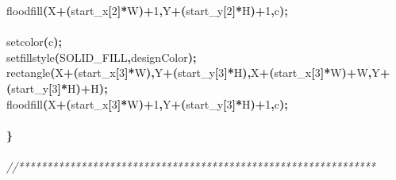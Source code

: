 \documentclass[a4paper, 10pt]{article}
\newcommand\SPC{\hspace*{0.6em}}
\newcommand{\CppAComment}[1]{\textit{\textcolor[rgb]{0.2,0.6,1}{#1}}}
\newcommand{\CppAIdentifier}[1]{#1}
\newcommand{\CppANumber}[1]{\textcolor[rgb]{0.5,0,0.5}{#1}}
\newcommand{\CppASpace}[1]{\colorbox[rgb]{1,1,1}{#1}}
\newcommand{\CppASymbol}[1]{\textbf{\textcolor[rgb]{1,0,0}{#1}}}
\begin{document}
\begin{ttfamily}
\CppASpace{\SPC }\CppAIdentifier{floodfill}\CppASymbol{(}\CppAIdentifier{X}\CppASymbol{+}\CppASymbol{(}\CppAIdentifier{start\_x}\CppASymbol{[}\CppANumber{2}\CppASymbol{]}\CppASymbol{*}\CppAIdentifier{W}\CppASymbol{)}\CppASymbol{+}\CppANumber{1}\CppASymbol{,}\CppAIdentifier{Y}\CppASymbol{+}\CppASymbol{(}\CppAIdentifier{start\_y}\CppASymbol{[}\CppANumber{2}\CppASymbol{]}\CppASymbol{*}\CppAIdentifier{H}\CppASymbol{)}\CppASymbol{+}\CppANumber{1}\CppASymbol{,}\CppAIdentifier{c}\CppASymbol{)}\CppASymbol{;}\\
\\
\CppASpace{\SPC }\CppAIdentifier{setcolor}\CppASymbol{(}\CppAIdentifier{c}\CppASymbol{)}\CppASymbol{;}\\
\CppASpace{\SPC }\CppAIdentifier{setfillstyle}\CppASymbol{(}\CppAIdentifier{SOLID\_FILL}\CppASymbol{,}\CppAIdentifier{designColor}\CppASymbol{)}\CppASymbol{;}\\
\CppASpace{\SPC }\CppAIdentifier{rectangle}\CppASymbol{(}\CppAIdentifier{X}\CppASymbol{+}\CppASymbol{(}\CppAIdentifier{start\_x}\CppASymbol{[}\CppANumber{3}\CppASymbol{]}\CppASymbol{*}\CppAIdentifier{W}\CppASymbol{)}\CppASymbol{,}\CppAIdentifier{Y}\CppASymbol{+}\CppASymbol{(}\CppAIdentifier{start\_y}\CppASymbol{[}\CppANumber{3}\CppASymbol{]}\CppASymbol{*}\CppAIdentifier{H}\CppASymbol{)}\CppASymbol{,}\CppAIdentifier{X}\CppASymbol{+}\CppASymbol{(}\CppAIdentifier{start\_x}\CppASymbol{[}\CppANumber{3}\CppASymbol{]}\CppASymbol{*}\CppAIdentifier{W}\CppASymbol{)}\CppASymbol{+}\CppAIdentifier{W}\CppASymbol{,}\CppAIdentifier{Y}\CppASymbol{+}\CppASymbol{(}\CppAIdentifier{start\_y}\CppASymbol{[}\CppANumber{3}\CppASymbol{]}\CppASymbol{*}\CppAIdentifier{H}\CppASymbol{)}\CppASymbol{+}\CppAIdentifier{H}\CppASymbol{)}\CppASymbol{;}\\
\CppASpace{\SPC }\CppAIdentifier{floodfill}\CppASymbol{(}\CppAIdentifier{X}\CppASymbol{+}\CppASymbol{(}\CppAIdentifier{start\_x}\CppASymbol{[}\CppANumber{3}\CppASymbol{]}\CppASymbol{*}\CppAIdentifier{W}\CppASymbol{)}\CppASymbol{+}\CppANumber{1}\CppASymbol{,}\CppAIdentifier{Y}\CppASymbol{+}\CppASymbol{(}\CppAIdentifier{start\_y}\CppASymbol{[}\CppANumber{3}\CppASymbol{]}\CppASymbol{*}\CppAIdentifier{H}\CppASymbol{)}\CppASymbol{+}\CppANumber{1}\CppASymbol{,}\CppAIdentifier{c}\CppASymbol{)}\CppASymbol{;}\\
\\
\CppASymbol{\}}\\
\\
\CppAComment{//***************************************************************}\\

\end{ttfamily}
\end{document}
